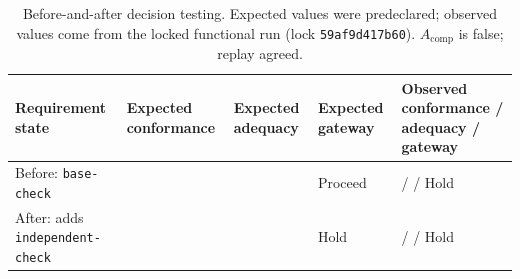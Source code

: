\begin{table}[pos=t]
\centering\small
\caption{Before-and-after decision testing. Expected values were predeclared; observed values come from the locked functional run (lock \texttt{59af9d417b60}). $A_{\mathrm{comp}}$ is false; replay agreed.}
\label{tab:functional-results}
\label{tab:functional-protocol}
\begin{tabularx}{\textwidth}{@{}L{.31\textwidth}L{.13\textwidth}L{.13\textwidth}L{.13\textwidth}Y@{}}
\toprule
Requirement state & Expected conformance & Expected adequacy & Expected gateway & Observed conformance / adequacy / gateway \\
\midrule
Before: \texttt{base-check} & \Pass{} & \Pass{} & Proceed & \Pass{} / \Fail{} / Hold \\
After: adds \texttt{independent-check} & \Pass{} & \Fail{} & Hold & \Pass{} / \Fail{} / Hold \\
\bottomrule
\end{tabularx}
\end{table}
